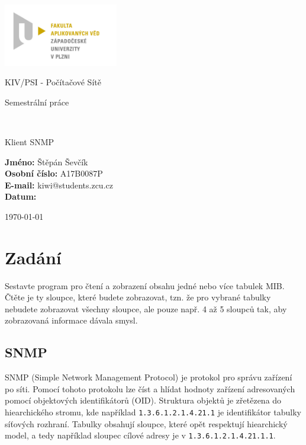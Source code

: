 \documentclass[12pt,a4paper]{article}
\author{Štěpán Ševčík}
\let\oldsection\section
\renewcommand\section{\clearpage\oldsection}
\begin{document}
\begin{titlepage}

\includegraphics[width=50mm]{img/FAV.jpg}
\\[160 pt]
\centerline{ \Huge \sc KIV/PSI - Počítačové Sítě}
\centerline{ \huge \sc Semestrální práce}
\\[12 pt]
{\large \sc
\centerline{Klient SNMP}
}


{
\vfill 
\parindent=0cm
\textbf{Jméno:} Štěpán Ševčík\\
\textbf{Osobní číslo:} A17B0087P\\
\textbf{E-mail:} kiwi@students.zcu.cz\\
\textbf{Datum:} {\large \today\par} %

}

\end{titlepage}

\newpage
\setcounter{page}{2}
\setcounter{tocdepth}{3}
\tableofcontents



\section{Zadání}
Sestavte program pro čtení a zobrazení obsahu jedné nebo více tabulek MIB.
Čtěte je ty sloupce, které budete zobrazovat, tzn. že pro vybrané tabulky nebudete zobrazovat všechny sloupce, ale pouze např. 4 až 5 sloupců tak, aby zobrazovaná informace dávala smysl.

\subsection{SNMP}
SNMP (Simple Network Management Protocol) je protokol pro správu zařízení po síti. Pomocí tohoto protokolu lze číst a hlídat hodnoty zařízení adresovaných pomocí objektových identifikátorů (OID).
Struktura objektů je zřetězena do hiearchického stromu, kde například \texttt{1.3.6.1.2.1.4.21.1} je identifikátor tabulky síťových rozhraní.
Tabulky obsahují sloupce, které opět respektují hiearchický model, a tedy například sloupec cílové adresy je v \texttt{1.3.6.1.2.1.4.21.1.1}.
\end{document}
